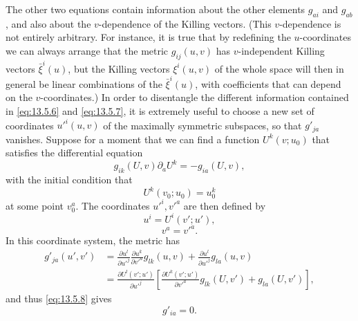 The other two equations contain information about the other elements
\(g_{ai}\) and \(g_{ab}\), and also about the \(v\)-dependence of the Killing
vectors. (This \(v\)-dependence is not entirely arbitrary. For instance, it
is true that by redefining the \(u\)-coordinates we can always arrange that
the metric \(g_{ij}(u,v)\) has \(v\)-independent Killing vectors
\(\bar\xi^i(u)\), but the Killing vectors \(\xi^i(u,v)\) of the whole space
will then in general be linear combinations of the \(\bar\xi^i(u)\), with
coefficients that can depend on the \(v\)-coordinates.) In order to
disentangle the different information contained in \eqref{eq:13.5.6} and
\eqref{eq:13.5.7}, it is extremely useful to choose a new set of coordinates
\(u'^i(u,v)\) of the maximally symmetric subspaces, so that \(g'_{ja}\)
vanishes. Suppose for a moment that we can find a function
\(U^k(v;u_0)\) that satisfies the differential equation
\begin{equation}
  g_{ik}(U,v)\partial_a U^k
  =
  -g_{ia}(U,v),
  \tag{13.5.8}\label{eq:13.5.8}
\end{equation}
with the initial condition that
\begin{equation}
  U^k(v_0;u_0)=u_0^k
  \tag{13.5.9}\label{eq:13.5.9}
\end{equation}
at some point \(v_0^a\). The coordinates \(u'^i,v'^a\) are then defined by
\begin{equation}
  u^i=U^i(v';u'),
  \tag{13.5.10}\label{eq:13.5.10}
\end{equation}
\begin{equation}
  v^a=v'^a.
  \tag{13.5.11}\label{eq:13.5.11}
\end{equation}
In this coordinate system, the metric has
\[
  \begin{aligned}
  g'_{ja}(u',v')
  &=
  \frac{\partial u^l}{\partial u'^j}
  \frac{\partial u^k}{\partial v'^a}g_{lk}(u,v)
  +
  \frac{\partial u^l}{\partial u'^j}g_{la}(u,v)
  \\
  &=
  \frac{\partial U^l(v';u')}{\partial u'^j}
  \left[
    \frac{\partial U^k(v';u')}{\partial v'^a}
    g_{lk}(U,v')
    +g_{la}(U,v')
  \right],
  \end{aligned}
\]
and thus \eqref{eq:13.5.8} gives
\begin{equation}
  g'_{ia}=0.
  \tag{13.5.12}\label{eq:13.5.12}
\end{equation}


